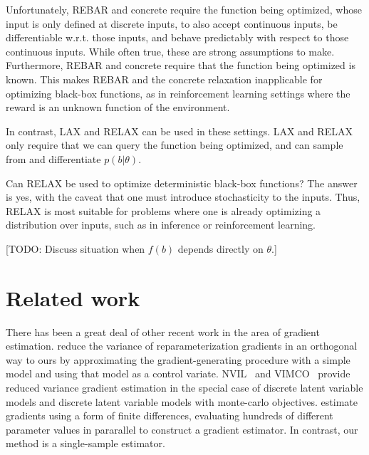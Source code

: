 \documentclass{article}
\newcommand{\loss}{f(b)}
\newcommand{\LAX}{{\textnormal{LAX}}}
\newcommand{\RELAX}{{\textnormal{RELAX}}}
\begin{document}
Unfortunately, REBAR and concrete require the function being optimized, whose input is only defined at discrete inputs, to also accept continuous inputs, be differentiable w.r.t. those inputs, and behave predictably with respect to those continuous inputs.
While often true, these are strong assumptions to make.
Furthermore, REBAR and concrete require that the function being optimized is known. 
This makes REBAR and the concrete relaxation inapplicable for optimizing black-box functions, as in reinforcement learning settings where the reward is an unknown function of the environment.

In contrast, \LAX{} and \RELAX{} can be used in these settings.
\LAX{} and \RELAX{} only require that we can query the function being optimized, and can sample from and differentiate $p(b|\theta)$.

Can \RELAX{} be used to optimize deterministic black-box functions?
The answer is yes, with the caveat that one must introduce stochasticity to the inputs.
Thus, \RELAX{} is most suitable for problems where one is already optimizing a distribution over inputs, such as in inference or reinforcement learning.

[TODO: Discuss situation when $\loss{}$ depends directly on $\theta$.]


\section{Related work}
There has been a great deal of other recent work in the area of gradient estimation.
\citet{miller2017reducing} reduce the variance of reparameterization gradients in an orthogonal way to ours by approximating the gradient-generating procedure with a simple model and using that model as a control variate.
NVIL~\citep{mnih2014neural} and VIMCO~\citep{mnih2016variational} provide reduced variance gradient estimation in the special case of discrete latent variable models and discrete latent variable models with monte-carlo objectives.
\citet{salimans2017evolution} estimate gradients using a form of finite differences, evaluating hundreds of different parameter values in pararallel to construct a gradient estimator.
In contrast, our method is a single-sample estimator.
\end{document}
